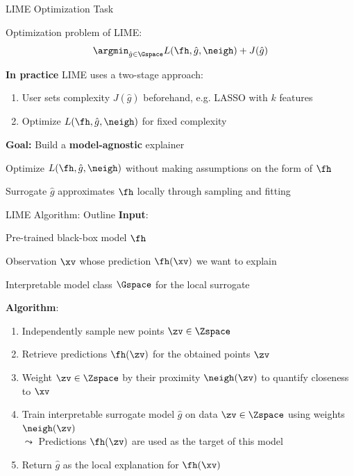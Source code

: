 \documentclass[10pt,compress,t,notes=noshow, xcolor=table]{beamer}
\newcommand{\gh}{\hat{g}}
\begin{document}
\begin{framei}[align=top]{LIME Optimization Task}
\item Optimization problem of LIME:
$$
\argmin_{\gh \in \Gspace} L(\fh, \gh, \neigh) + J(\gh)
$$
\item \textbf{In practice} LIME uses a two-stage approach:
\begin{enumerate}
\item User sets complexity $J(\gh)$ beforehand, e.g. LASSO with $k$ features
\item Optimize $L(\fh, \gh, \neigh)$ for fixed complexity
\end{enumerate}
\item \textbf{Goal:} Build a \textbf{model-agnostic} explainer
\begin{itemizeS}
\item[$\leadsto$] Optimize $L(\fh, \gh, \neigh)$ without making assumptions on the form of $\fh$
\item[$\leadsto$] Surrogate $\gh$ approximates $\fh$ locally through sampling and fitting
\end{itemizeS}
\end{framei}


\begin{framev}[align=top]{LIME Algorithm: Outline }
\textbf{Input}:
\begin{itemizeM}
\item Pre-trained black-box model $\fh$
\item Observation $\xv$ whose prediction $\fh(\xv)$ we want to explain
\item Interpretable model class $\Gspace$ for the local surrogate
\end{itemizeM}
\pause
\textbf{Algorithm}:
\begin{enumerate}
\item Independently sample new points $\zv \in \Zspace$
\item Retrieve predictions $\fh(\zv)$ for the obtained points $\zv$
\item Weight $\zv \in \Zspace$ by their proximity $\neigh(\zv)$ to quantify closeness to $\xv$
\item Train interpretable surrogate model $\gh$ on data $\zv \in \Zspace$ using weights $\neigh(\zv)$\\
$\leadsto$ Predictions $\fh(\zv)$ are used as the target of this model
\item Return $\gh$ as the local explanation for $\fh(\xv)$
\end{enumerate}
\end{framev}
\end{document}
